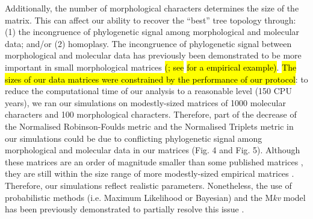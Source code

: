 \documentclass[12pt,letterpaper]{article}
\begin{document}
Additionally, the number of morphological characters determines the size of the matrix.
This can affect our ability to recover the ``best'' tree topology through: (1) the incongruence of phylogenetic signal among morphological and molecular data; and/or (2) homoplasy.
The incongruence of phylogenetic signal between morphological and molecular data has previously been demonstrated to be more important in small morphological matrices \hl{(}\citealt{bremer1992phylogeny,patterson1993congruence}\hl{; see }\citealt{masters2002lack}\hl{ for a empirical example)}.
\hl{The sizes of our data matrices were constrained by the performance of our protocol}: to reduce the computational time of our analysis to a reasonable level (150 CPU years), we ran our simulations on modestly-sized matrices of 1000 molecular characters and 100 morphological characters.
Therefore, part of the decrease of the Normalised Robinson-Foulds metric and the Normalised Triplets metric in our simulations could be due to conflicting phylogenetic signal among morphological and molecular data in our matrices (Fig. 4 and Fig. 5).
Although these matrices are an order of magnitude smaller than some published matrices \citep[e.g.][]{springermacroevolutionary2012,nithe2013}, they are still within the size range of more modestly-sized empirical matrices \citep[e.g.][]{kellymolecular2014, sallam2011craniodental}.
Therefore, our simulations reflect realistic parameters.
Nonetheless, the use of probabilistic methods (i.e. Maximum Likelihood or Bayesian) and the M\textit{kv} model \citep{lewisa2001} has been previously demonstrated to partially resolve this issue \citep{wrightbayesian2014}.
\end{document}
